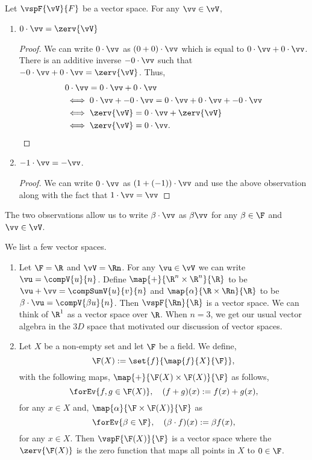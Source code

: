 \begin{Observation}
    Let $\vspF{\vV}{F}$ be a vector space. For any $\vv \in \vV$,
    \begin{enumerate}
	\item
	    $0\cdot\vv = \zerv{\vV}$
	    \begin{proof}
		We can write $0\cdot\vv$ as $(0+0)\cdot\vv$ which is equal to $0\cdot\vv + 0\cdot\vv$. There
		is an additive inverse $-0\cdot\vv$ such that $-0\cdot\vv + 0\cdot\vv = \zerv{\vV}$. Thus,
		\begin{align*}
		    &0\cdot\vv = 0\cdot\vv + 0\cdot\vv \\
		    &\iff 0\cdot\vv + -0\cdot\vv = 0\cdot\vv + 0\cdot\vv + -0\cdot\vv \\
		    &\iff \zerv{\vV} = 0\cdot\vv + \zerv{\vV} \\
		    &\iff \zerv{\vV} = 0\cdot\vv.
		\end{align*}	    
	    \end{proof}
	\item
	    $-1\cdot\vv = -\vv$.
	    \begin{proof}
		We can write $0\cdot\vv$ as $(1 + (-1))\cdot\vv$ and use the above observation along with the 
		fact that
		$1\cdot\vv = \vv$
	    \end{proof}
    \end{enumerate}
\end{Observation}
The two observations allow us to write $\beta\cdot\vv$ as $\beta\vv$ for any $\beta\in\F$ and $\vv\in\vV$.
\begin{Example}
    We list a few vector spaces.
    \begin{enumerate}
	\item
	    Let $\F = \R$ and $\vV = \Rn$. For any $\vu \in \vV$ we can write $\vu = \compV{u}{n}$. 
	    Define $\map{+}{\R^n\times\R^n}{\R}$ to be $\vu + \vv = \compSumV{u}{v}{n}$ and \break{}
	    $\map{\alpha}{\R\times\Rn}{\R}$ to be $\beta\cdot\vu = \compV{\beta u}{n}$.
	    Then $\vspF{\Rn}{\R}$ is a vector space.
	    We can think of $\R^1$ as a vector space over $\R$. When $n = 3$, we get our usual vector algebra
	    in the $3D$ space that motivated our discussion of vector spaces.
	\item
	    Let $X$ be a non-empty set and let $\F$ be a field.  We define,
	    \[\F(X) := \set{f}{\map{f}{X}{\F}},\]
	    with the following maps,
	    $\map{+}{\F(X)\times\F(X)}{\F}$ as follows,
	    \[\forEv{f,g\in\F(X)},\quad (f+g)(x) := f(x) + g(x),\]
	    for any $x\in X$ and, 
	    $\map{\alpha}{\F\times\F(X)}{\F}$ as
	    \[\forEv{\beta\in\F},\quad(\beta\cdot f)(x) := \beta f(x), \]
	    for any $x\in X$. Then $\vspF{\F(X)}{\F}$ is a vector space where the $\zerv{\F(X)}$ is the zero
	    function that maps all points in $X$ to $0 \in \F$.
    \end{enumerate}
\end{Example}

